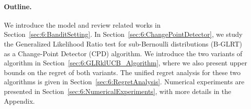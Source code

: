 



\paragraph{Outline.}
%
We introduce the model and review related works in Section~\ref{sec:6:BanditSetting}. In Section~\ref{sec:6:ChangePointDetector}, we study the Generalized Likelihood Ratio test for sub-Bernoulli distributions (B-GLRT) as a Change-Point Detector (CPD) algorithm.
We introduce the two variants of \GLRklUCB{} algorithm in Section~\ref{sec:6:GLRklUCB_Algorithm}, where we also present upper bounds on the regret of both variants.
The unified regret analysis for these two algorithms is given in Section~\ref{sec:6:RegretAnalysis}.
Numerical experiments are presented in Section~\ref{sec:6:NumericalExperiments}, with more details in the Appendix.

